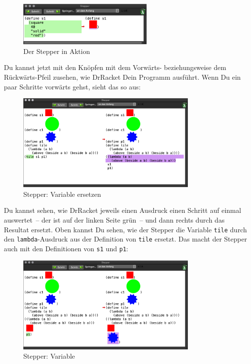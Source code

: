 \begin{figure}[H]
  \centering
  \includegraphics[width=0.6\textwidth]{i1prog/stepper-0}
  \caption{Der Stepper in Aktion}
  \label{fig:stepper-0}
\end{figure}
%
\noindent Du kannst jetzt mit den Knöpfen mit dem Vorwärts- beziehungsweise dem
Rückwärts-Pfeil zusehen, wie DrRacket Dein Programm ausführt.  Wenn Du
ein paar Schritte vorwärts gehst, sieht das so aus:
%
\begin{figure}[H]
  \centering
  \includegraphics[width=0.8\textwidth]{i1prog/stepper-1}
  \caption{Stepper: Variable ersetzen}
  \label{fig:stepper-1}
\end{figure}
%
\noindent Du kannst sehen, wie DrRacket jeweils einen Ausdruck einen Schritt auf
einmal auswertet~-- der ist auf der linken Seite grün~-- und dann
rechts durch das Resultat ersetzt.  Oben kannst Du sehen, wie der
Stepper die Variable \texttt{tile} durch den \texttt{lambda}-Ausdruck
aus der Definition von \texttt{tile} ersetzt. Das macht der Stepper
auch mit den Definitionen von \texttt{s1} und \texttt{p1}:
%
\begin{figure}[H]
  \centering
  \includegraphics[width=0.8\textwidth]{i1prog/stepper-2}
  \caption{Stepper: Variable}
  \label{fig:stepper-2}
\end{figure}

